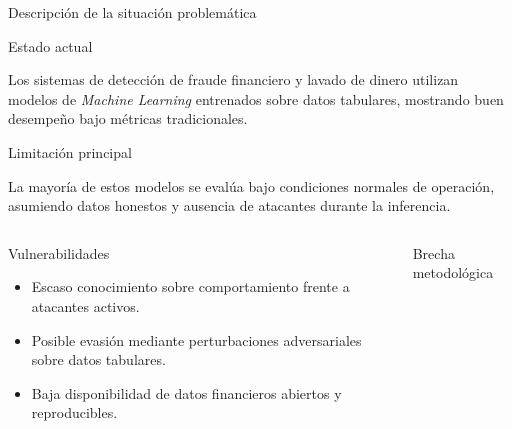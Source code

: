 \documentclass[aspectratio=169, 8pt]{beamer}
\begin{document}
\begin{frame}{Descripción de la situación problemática}

\begin{block}{Estado actual}

Los sistemas de detección de fraude financiero y
lavado de dinero utilizan modelos de
\textit{Machine Learning} entrenados sobre datos
tabulares, mostrando buen desempeño bajo
métricas tradicionales.

\end{block}

\vspace{0.15cm}

\begin{alertblock}{Limitación principal}

La mayoría de estos modelos se evalúa bajo
condiciones normales de operación, asumiendo
datos honestos y ausencia de atacantes durante
la inferencia.

\end{alertblock}

\vspace{0.15cm}

\begin{columns}


\begin{block}{Vulnerabilidades}

\begin{itemize}

\item Escaso conocimiento sobre comportamiento
frente a atacantes activos.

\item Posible evasión mediante perturbaciones
adversariales sobre datos tabulares.

\item Baja disponibilidad de datos financieros
abiertos y reproducibles.

\end{itemize}

\end{block}



\begin{block}{Brecha metodológica}

\begin{itemize}


\end{itemize}
\end{block}
\end{columns}
\end{frame}
\end{document}
